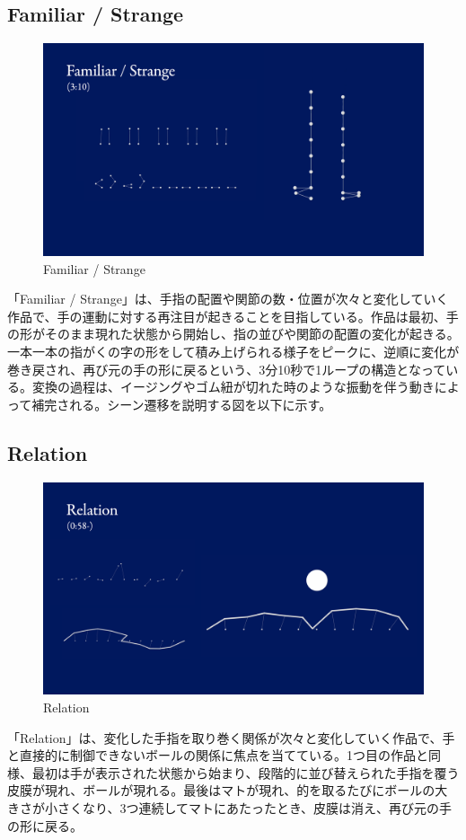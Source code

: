 \subsection*{Familiar / Strange}
\begin{figure}[H]
  \centering
  \includegraphics[width=15cm]{img/fs-02.png}
  \caption{Familiar / Strange}
  \label{fig:familiar_strange}
\end{figure}
「Familiar / Strange」は、手指の配置や関節の数・位置が次々と変化していく作品で、手の運動に対する再注目が起きることを目指している。作品は最初、手の形がそのまま現れた状態から開始し、指の並びや関節の配置の変化が起きる。一本一本の指がくの字の形をして積み上げられる様子をピークに、逆順に変化が巻き戻され、再び元の手の形に戻るという、3分10秒で1ループの構造となっている。変換の過程は、イージングやゴム紐が切れた時のような振動を伴う動きによって補完される。シーン遷移を説明する図を以下に示す。

\subsection*{Relation}
\begin{figure}[H]
  \centering
  \includegraphics[width=15cm]{img/relation.png}
  \caption{Relation}
  \label{fig:relation}
\end{figure}
「Relation」は、変化した手指を取り巻く関係が次々と変化していく作品で、手と直接的に制御できないボールの関係に焦点を当てている。1つ目の作品と同様、最初は手が表示された状態から始まり、段階的に並び替えられた手指を覆う皮膜が現れ、ボールが現れる。最後はマトが現れ、的を取るたびにボールの大きさが小さくなり、3つ連続してマトにあたったとき、皮膜は消え、再び元の手の形に戻る。


